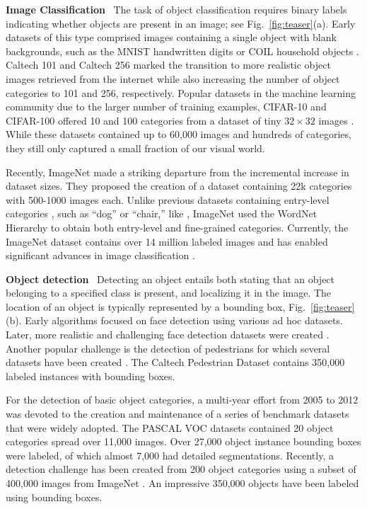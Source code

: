 \textbf{Image Classification}~ The task of object classification requires binary labels indicating whether objects are present in an image; see Fig.~\ref{fig:teaser}(a). Early datasets of this type comprised images containing a single object with blank backgrounds, such as the MNIST handwritten digits \cite{mnist} or COIL household objects \cite{nene1996columbia}. Caltech 101 \cite{Caltech101} and Caltech 256 \cite{Caltech256} marked the transition to more realistic object images retrieved from the internet while also increasing the number of object categories to 101 and 256, respectively. Popular datasets in the machine learning community due to the larger number of training examples, CIFAR-10 and CIFAR-100 \cite{krizhevsky2009learning} offered 10 and 100 categories from a dataset of tiny $32 \times 32$ images \cite{torralba200880}. While these datasets contained up to 60,000 images and hundreds of categories, they still only captured a small fraction of our visual world.

Recently, ImageNet \cite{Imagenet} made a striking departure from the incremental increase in dataset sizes. They proposed the creation of a dataset containing 22k categories with 500-1000 images each. Unlike previous datasets containing entry-level categories \cite{ordonezlarge}, such as ``dog'' or ``chair,'' like \cite{torralba200880}, ImageNet used the WordNet Hierarchy \cite{wordnet} to obtain both entry-level and fine-grained \cite{Birds200} categories. Currently, the ImageNet dataset contains over 14 million labeled images and has enabled significant advances in image classification \cite{Hinton,GirshickDDM13,OverFeat}.

\textbf{Object detection}~ Detecting an object entails both stating that an object belonging to a specified class is present, and localizing it in the image. The location of an object is typically represented by a bounding box, Fig.~\ref{fig:teaser}(b). Early algorithms focused on face detection \cite{hjelmaas2001face} using various ad hoc datasets. Later, more realistic and challenging face detection datasets were created \cite{LFWTech}. Another popular challenge is the detection of pedestrians for which several datasets have been created \cite{Dalal,Dollar2012PAMI}. The Caltech Pedestrian Dataset \cite{Dollar2012PAMI} contains 350,000 labeled instances with bounding boxes.

For the detection of basic object categories, a multi-year effort from 2005 to 2012 was devoted to the creation and maintenance of a series of benchmark datasets that were widely adopted. The PASCAL VOC \cite{PASCAL} datasets contained 20 object categories spread over 11,000 images. Over 27,000 object instance bounding boxes were labeled, of which almost 7,000 had detailed segmentations. Recently, a detection challenge has been created from 200 object categories using a subset of 400,000 images from ImageNet \cite{ILSVRCanalysis_ICCV2013}. An impressive 350,000 objects have been labeled using bounding boxes.

